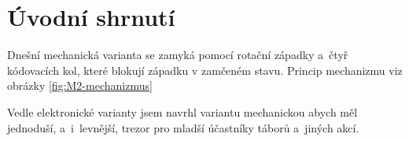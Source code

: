 \section{Úvodní shrnutí}

Dnešní mechanická varianta se zamyká pomocí rotační západky a~čtyř kódovacích kol, které blokují západku v zamčeném stavu. \newline
Princip mechanizmu viz obrázky \ref{fig:M2-mechanizmus}

Vedle elektronické varianty jsem navrhl variantu mechanickou abych měl jednoduší, a~i~levnější, trezor pro mladší účastníky táborů a~jiných akcí. 

\newpage